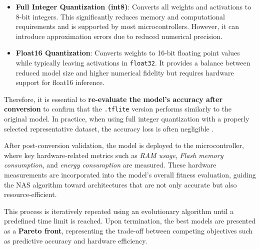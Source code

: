 \begin{itemize}
    \item \textbf{Full Integer Quantization (int8)}: Converts all weights and activations to 8-bit integers. This significantly reduces memory and computational requirements and is supported by most microcontrollers. However, it can introduce approximation errors due to reduced numerical precision.
    
    \item \textbf{Float16 Quantization}: Converts weights to 16-bit floating point values while typically leaving activations in \texttt{float32}. It provides a balance between reduced model size and higher numerical fidelity but requires hardware support for float16 inference.
\end{itemize}

Therefore, it is essential to \textbf{re-evaluate the model’s accuracy after conversion} to confirm that the \texttt{.tflite} version performs similarly to the original model. In practice, when using full integer quantization with a properly selected representative dataset, the accuracy loss is often negligible \cite{tensorflow2023quantization}.

After post-conversion validation, the model is deployed to the microcontroller, where key hardware-related metrics such as \textit{RAM usage}, \textit{Flash memory consumption}, and \textit{energy consumption} are measured. These hardware measurements are incorporated into the model’s overall fitness evaluation, guiding the NAS algorithm toward architectures that are not only accurate but also resource-efficient.

This process is iteratively repeated using an evolutionary algorithm until a predefined time limit is reached. Upon termination, the best models are presented as a \textbf{Pareto front}, representing the trade-off between competing objectives such as predictive accuracy and hardware efficiency.

